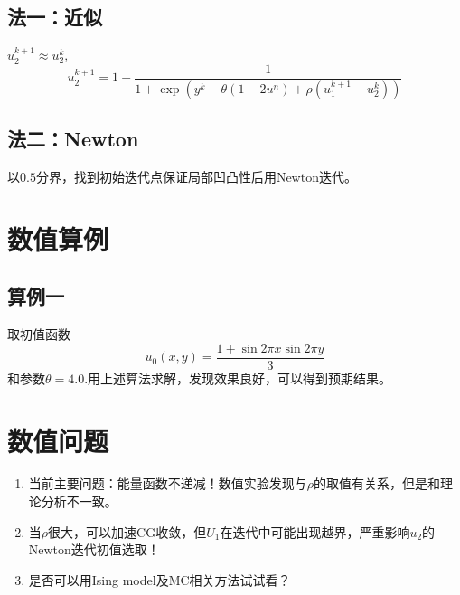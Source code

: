 \documentclass[11pt,a4 paper,one side]{article}
\begin{document}
\subsection{法一：近似}
$u_2^{k+1} \approx u_2^k$,\begin{equation}
    u_2^{k+1} = 1 - \frac{1}{1+\exp{ (y^k-\theta (1-2u^n)+\rho (u_1^{k+1}-u_2^k))}}
\end{equation}
\subsection{法二：Newton}
以$0.5$分界，找到初始迭代点保证局部凹凸性后用Newton迭代。
\section{数值算例}
\subsection{算例一}取初值函数\begin{equation}
u_0(x,y)=\frac{1+\sin{2\pi x}\sin {2\pi y}}{3}
\end{equation}
和参数$\theta = 4.0$.用上述算法求解，发现效果良好，可以得到预期结果。
\section{数值问题}
\begin{enumerate}
\item 当前主要问题：能量函数不递减！数值实验发现与$\rho$的取值有关系，但是和理论分析不一致。
\item 当$\rho$很大，可以加速CG收敛，但$U_1$在迭代中可能出现越界，严重影响$u_2$的Newton迭代初值选取！
\item 是否可以用Ising model及MC相关方法试试看？
\end{enumerate}
\end{document}
